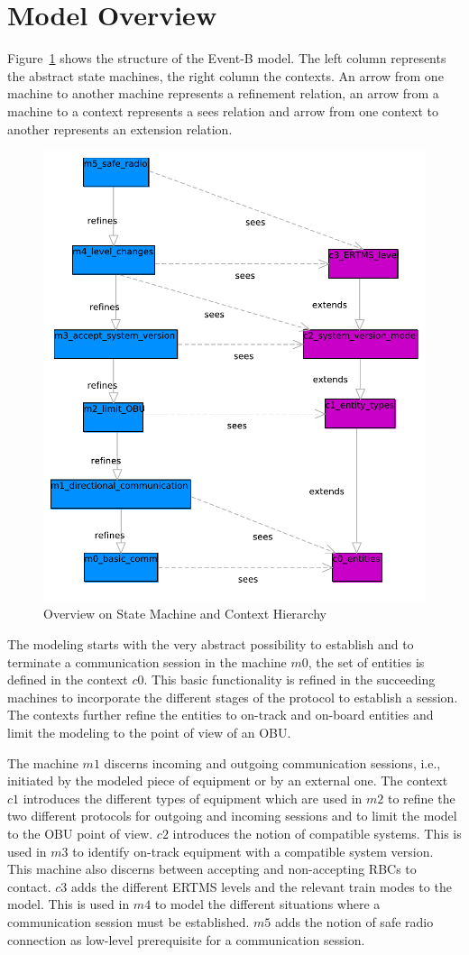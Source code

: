 \documentclass[10pt,a4paper]{article}
\begin{document}
\section{Model Overview}
\label{sec:model-overview}

Figure~\ref{fig:model-overview} shows the structure of the Event-B model. The
left column represents the abstract state machines, the right column the
contexts. An arrow from one machine to another machine represents a refinement
relation, an arrow from a machine to a context represents a sees relation and
arrow from one context to another represents an extension relation.

\begin{figure}[ht]
  \centering
  \includegraphics[width=.65\textwidth]{Subset_026_comm_session}
  \caption{Overview on State Machine and Context Hierarchy}
  \label{fig:model-overview}
\end{figure}

The modeling starts with the very abstract possibility to establish and to
terminate a communication session in the machine $m0$, the set of entities is
defined in the context $c0$. This basic functionality is refined in the
succeeding machines to incorporate the different stages of the protocol to
establish a session. The contexts further refine the entities to on-track and
on-board entities and limit the modeling to the point of view of an OBU.

The machine $m1$ discerns incoming and outgoing communication sessions, i.e.,
initiated by the modeled piece of equipment or by an external one. The context
$c1$ introduces the different types of equipment which are used in $m2$ to
refine the two different protocols for outgoing and incoming sessions and to
limit the model to the OBU point of view. $c2$ introduces the notion of
compatible systems. This is used in $m3$ to identify on-track equipment with a
compatible system version. This machine also discerns between accepting and
non-accepting RBCs to contact. $c3$ adds the different ERTMS levels and the
relevant train modes to the model. This is used in $m4$ to model the different
situations where a communication session must be established. $m5$ adds the
notion of safe radio connection as low-level prerequisite for a communication
session.
\end{document}
